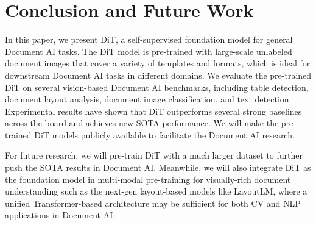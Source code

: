 \documentclass[sigconf]{acmart}
\begin{document}
\section{Conclusion and Future Work}

In this paper, we present DiT, a self-supervised foundation model for general Document AI tasks. The DiT model is pre-trained with large-scale unlabeled document images that cover a variety of templates and formats, which is ideal for downstream Document AI tasks in different domains. We evaluate the pre-trained DiT on several vision-based Document AI benchmarks, including  table detection, document layout analysis, document image classification, and text detection. Experimental results have shown that DiT outperforms several strong baselines across the board and achieves new SOTA performance. We will make the pre-trained DiT models publicly available to facilitate the Document AI research.

For future research, we will pre-train DiT with a much larger dataset to further push the SOTA results in Document AI. Meanwhile, we will also integrate DiT as the foundation model in multi-modal pre-training for visually-rich document understanding such as the next-gen layout-based models like LayoutLM, where a unified Transformer-based architecture may be sufficient for both CV and NLP applications in Document AI.




\end{document}
